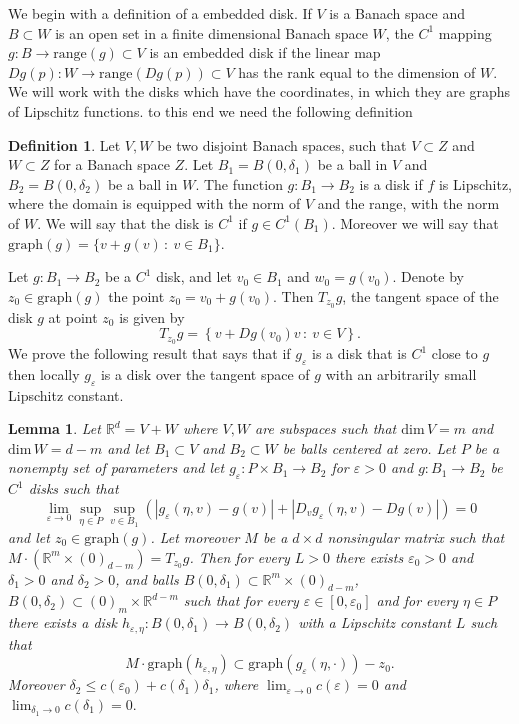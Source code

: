 \documentclass[11pt, leqno]{amsart}
\newtheorem{lem}[thm]{Lemma}
\theoremstyle{definition}
\newtheorem{df}[thm]{Definition}
\def\R{\mathbb{R}}
\begin{document}
We begin with a definition of a embedded disk. If $V$ is a Banach space and  $B\subset W$ is an open set in a finite dimensional Banach space $W$, the $C^1$ mapping $g:B\to \textrm{range}(g)\subset V$ is an embedded disk if the linear map $Dg(p):W\to \textrm{range}(Dg(p))\subset V$ has the rank equal to the dimension of $W$.  We will work with the disks which have the coordinates, in which they are graphs of Lipschitz functions. to this end we need the following definition
\begin{df}
	Let $V,W$ be two disjoint Banach spaces, such that $V\subset Z$ and $W\subset Z$ for a Banach space $Z$. Let $B_1 = B(0,\delta_1)$ be a ball in $V$ and $B_2 = B(0,\delta_2)$ be a ball in $W$. The function $g:B_1\to B_2$ is a disk if $f$ is Lipschitz, where the domain is equipped with the norm of $V$ and the range, with the norm of $W$. We will say that the disk is $C^1$ if $g\in C^1(B_1)$. Moreover we will say that $\text{graph}(g) = \{v+g(v)\, :\ v\in B_1\}$.  
\end{df}
Let $g:B_1\to B_2$ be a $C^1$ disk, and let $v_0 \in B_1$ and $w_0 = g(v_0)$. Denote by $z_0\in \text{graph}(g)$ the point $z_0=v_0+g(v_0)$. Then $T_{z_0} g$, the tangent space of the disk $g$ at point $z_0$ is given by
$$
T_{z_0} g =\left\{ v+D g(v_0)v\,:\ v\in V\right\}.
$$    
We prove the following result that says that if $g_\varepsilon$ is a disk that is $C^1$ close to $g$ then locally $g_\varepsilon$ is a disk over the tangent space of $g$ with an arbitrarily small Lipschitz constant. 
\begin{lem}\label{lemma_disks}
	Let $\R^d = V+W$ where $V,W$ are subspaces such that $\textrm{dim}\, V = m$ and $\textrm{dim}\, W = d-m$ and let $B_1\subset V$ and $B_2\subset W$ be balls centered at zero. Let $P$ be a nonempty set of parameters and let  $g_\varepsilon:P\times B_1\to B_2$ for $\varepsilon>0$ and  $g:B_1\to B_2$ be $C^1$  disks such that
	$$
	\lim_{\varepsilon\to 0} \sup_{\eta\in P}\sup_{v\in B_1}\left(|g_\varepsilon(\eta,v)-g(v)|+\left|D_vg_\varepsilon (\eta,v)-Dg (v)\right|\right) =0
	$$
	and let $z_0\in \text{graph} (g)$. Let moreover  $M$ be a $d\times d$ nonsingular matrix such that $M\cdot (\R^m\times (0)_{d-m}) = T_{z_0} g$. Then for every $L>0$ there exists $\varepsilon_0>0$ and  $\delta_1>0$ and $\delta_2>0$, and balls $B(0,\delta_1)\subset \R^m \times (0)_{d-m}$, $B(0,\delta_2)\subset (0)_m\times \R^{d-m}$  such that for every $\varepsilon\in [0,\varepsilon_0]$ and for every $\eta\in P$ there exists a disk $h_{\varepsilon,\eta}: B(0,\delta_1)\to B(0,\delta_2)$ with a Lipschitz constant $L$ such that
	$$
	M\cdot \text{graph}(h_{\varepsilon,\eta}) \subset  \text{graph}(g_\varepsilon(\eta,\cdot))-z_0. 
	$$ 
	Moreover $\delta_2\leq c(\varepsilon_0) + c(\delta_1)\delta_1$, where $\lim_{\varepsilon\to 0}c(\varepsilon) = 0$ and $\lim_{\delta_1\to 0}c(\delta_1) = 0.$
	\end{lem}
\end{document}
